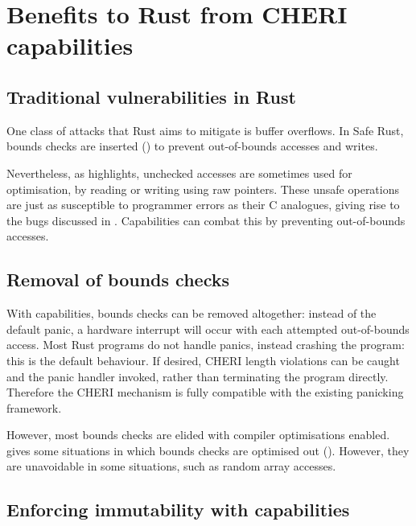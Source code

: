 \documentclass[dissertation.tex]{subfiles}
\begin{document}
\section{Benefits to Rust from CHERI capabilities}
\label{sec:eval-rust}

\subsection{Traditional vulnerabilities in Rust}
\label{sec:eval-rust-vulns}

One class of attacks that Rust aims to mitigate is buffer overflows.
In Safe Rust, bounds checks are inserted ()
to prevent out-of-bounds accesses and writes.

Nevertheless, as  highlights, unchecked accesses
are sometimes used for optimisation, by reading or writing using raw
pointers.
These unsafe operations are just as susceptible to programmer errors as
their C analogues, giving rise to the bugs discussed in
.
Capabilities can combat this by preventing out-of-bounds accesses.


\subsection{Removal of bounds checks}
\label{sec:eval-rust-bounds}

With capabilities, bounds checks can be removed altogether: instead of
the default panic, a hardware interrupt will occur with each attempted
out-of-bounds access.
Most Rust programs do not handle panics, instead crashing the program:
this is the default behaviour.
If desired, CHERI length violations can be caught and the panic handler
invoked, rather than terminating the program directly.
Therefore the CHERI mechanism is fully compatible with the existing
panicking framework.

However, most bounds checks are elided with compiler optimisations
enabled.
 gives some situations in which bounds checks are
optimised out ().
However, they are unavoidable in some situations, such as random array
accesses.


\subsection{Enforcing immutability with capabilities}
\label{sec:eval-rust-enforce-immut}
\end{document}
